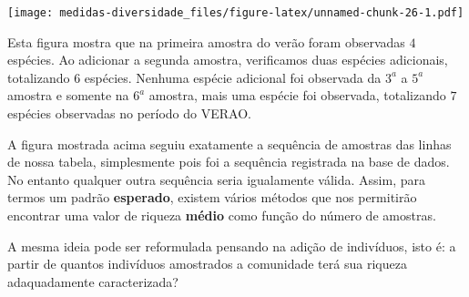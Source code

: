 \documentclass[
]{book}
\newenvironment{Shaded}{\begin{snugshade}}{\end{snugshade}}
\newcommand{\AttributeTok}[1]{\textcolor[rgb]{0.77,0.63,0.00}{#1}}
\newcommand{\DecValTok}[1]{\textcolor[rgb]{0.00,0.00,0.81}{#1}}
\newcommand{\FunctionTok}[1]{\textcolor[rgb]{0.00,0.00,0.00}{#1}}
\newcommand{\NormalTok}[1]{#1}
\newcommand{\OtherTok}[1]{\textcolor[rgb]{0.56,0.35,0.01}{#1}}
\newcommand{\SpecialCharTok}[1]{\textcolor[rgb]{0.00,0.00,0.00}{#1}}
\newcommand{\StringTok}[1]{\textcolor[rgb]{0.31,0.60,0.02}{#1}}
\begin{document}
\begin{Shaded}
\end{Shaded}

\texttt{[image: medidas-diversidade\_files/figure-latex/unnamed-chunk-26-1.pdf]}

Esta figura mostra que na primeira amostra do verão foram observadas \(4\) espécies. Ao adicionar a segunda amostra, verificamos duas espécies adicionais, totalizando \(6\) espécies. Nenhuma espécie adicional foi observada da \(3^a\) a \(5^a\) amostra e somente na \(6^a\) amostra, mais uma espécie foi observada, totalizando \(7\) espécies observadas no período do VERAO.

A figura mostrada acima seguiu exatamente a sequência de amostras das linhas de nossa tabela, simplesmente pois foi a sequência registrada na base de dados. No entanto qualquer outra sequência seria igualamente válida. Assim, para termos um padrão \textbf{esperado}, existem vários métodos que nos permitirão encontrar uma valor de riqueza \textbf{médio} como função do número de amostras.

A mesma ideia pode ser reformulada pensando na adição de indivíduos, isto é: a partir de quantos indivíduos amostrados a comunidade terá sua riqueza adaquadamente caracterizada?
\end{document}
